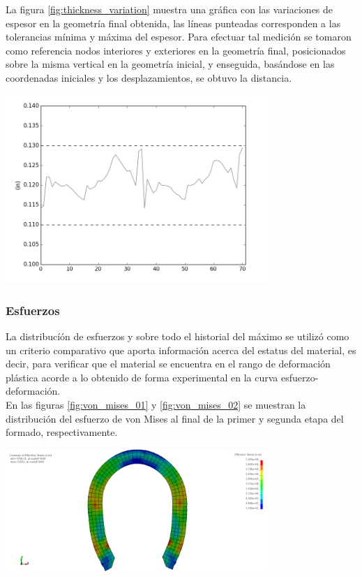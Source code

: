 La figura \ref{fig:thickness_variation} muestra una gráfica con las variaciones de espesor en la geometría 
final obtenida, las líneas punteadas corresponden a las tolerancias mínima y máxima del espesor. Para 
efectuar tal medición se tomaron como referencia nodos interiores y exteriores en la geometría final, 
posicionados sobre la misma vertical en la geometría inicial, y enseguida, basándose en las coordenadas 
iniciales y los desplazamientos, se obtuvo la distancia.

\begin{center}
\includegraphics[width=0.75\textwidth]{src/ch4/thickness_variation.png}
\label{fig:thickness_variation}
\end{center}

\subsubsection{Esfuerzos}

La distribucíón de esfuerzos y sobre todo el historial del máximo se utilizó como 
un criterio comparativo  que aporta información acerca del estatus del material, 
es decir, para verificar que el material se encuentra en el rango de deformación 
plástica acorde a lo obtenido de forma experimental en la curva esfuerzo-deformación.\\

En las figuras \ref{fig:von_mises_01} y \ref{fig:von_mises_02} se muestran la 
distribución del esfuerzo de von Mises al final de la primer y segunda etapa 
del formado, respectivamente. 

\begin{center}
\includegraphics[width=0.75\textwidth]{src/ch4/von_mises_01.png}
\label{fig:von_mises_01}
\end{center}

